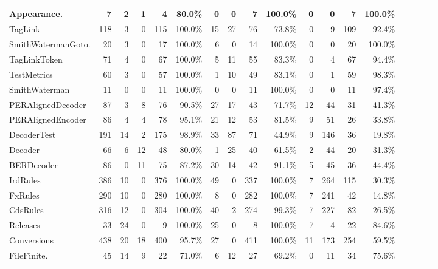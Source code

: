 \begin{table*}[t]
\begin{SmallOut}
\begin {tabular} {|l|r|r|r|r|r|r|r|r|r|r|r|r|r|r|r|r|r|}
\hline
  Appearance.    & 7   & 2    & 1  & 4   & 80.0\% & 0  & 0  & 7   & 100.0\%& 0  & 0 & 7     & 100.0\%\\
\hline\hline
  TagLink                      & 118 & 3    & 0  & 115 & 100.0\%& 15 & 27 & 76  & 73.8\% & 0  & 9 & 109  & 92.4\%\\
\hline
SmithWatermanGoto.& 20 & 3    &  0 & 17  & 100.0\%& 6  & 0  &  14 & 100.0\%& 0  & 0 & 20   & 100.0\%\\
\hline
  TagLinkToken                  & 71 & 4    & 0  & 67  & 100.0\%& 5  & 11 &  55 & 83.3\% & 0  & 4 & 67   & 94.4\%\\
\hline
  TestMetrics                   & 60 & 3    & 0  & 57  & 100.0\%& 1  & 10 & 49  & 83.1\% & 0  & 1 & 59   & 98.3\%\\
\hline
  SmithWaterman                 & 11 & 0    & 0  & 11  & 100.0\%& 0  & 0  & 11  & 100.0\%& 0  & 0 & 11  & 97.4\%\\
\hline\hline
  PERAlignedDecoder & 87   & 3  & 8  & 76  & 90.5\% & 27 & 17 & 43  & 71.7\% & 12 & 44 & 31  & 41.3\%\\
\hline
  PERAlignedEncoder & 86   & 4  & 4  & 78  & 95.1\% & 21 & 12 & 53  & 81.5\% & 9  & 51 & 26  & 33.8\%\\
\hline
  DecoderTest       & 191  & 14 &  2 & 175 & 98.9\% & 33 & 87 & 71  & 44.9\% & 9  & 146& 36  & 19.8\%\\
\hline
  Decoder           & 66   & 6  & 12 & 48  & 80.0\% & 1  & 25 & 40  & 61.5\% & 2  & 44 & 20  & 31.3\%\\
\hline
  BERDecoder        & 86   & 0  & 11 & 75  & 87.2\% & 30 & 14 & 42  & 91.1\% & 5  & 45 & 36  & 44.4\%\\
\hline\hline
  IrdRules          & 386  & 10 & 0  & 376 & 100.0\%& 49 & 0  & 337 & 100.0\%& 7  & 264 & 115 & 30.3\%\\
\hline
  FxRules           & 290  & 10 & 0  & 280 & 100.0\%& 8  & 0  & 282 & 100.0\%& 7  & 241 & 42  & 14.8\%\\
\hline
  CdsRules          & 316  & 12 & 0  & 304 & 100.0\%& 40 & 2  & 274 & 99.3\% & 7  & 227 & 82  & 26.5\%\\
\hline
  Releases          & 33   & 24 & 0  & 9   & 100.0\%& 25 & 0  & 8   & 100.0\%& 7  & 4   & 22  & 84.6\%\\
\hline
  Conversions       & 438  & 20 & 18 & 400 & 95.7\% & 27 & 0  & 411 & 100.0\%& 11 & 173 & 254 & 59.5\%\\
\hline\hline
FileFinite.    & 45   & 14  & 9  & 22  & 71.0\% & 6   & 12 & 27  & 69.2\% & 0  & 11& 34   & 75.6\%\\

\end{tabular}
\end{SmallOut}
\end{table*}
